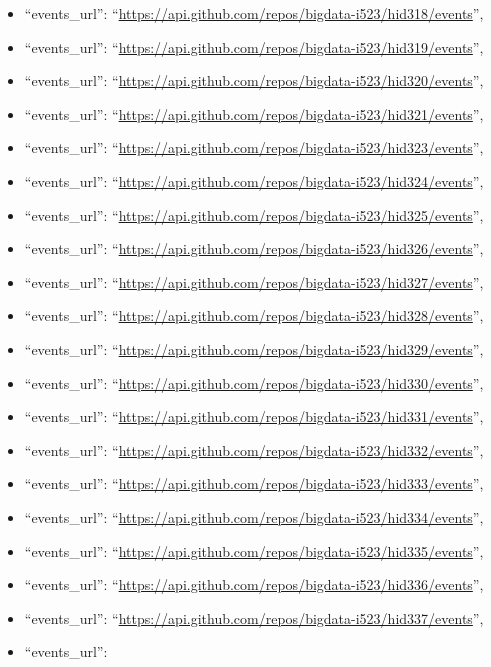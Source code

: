 \begin{itemize}
\item
  ``events\_url'':
  ``\url{https://api.github.com/repos/bigdata-i523/hid318/events}'',
\item
  ``events\_url'':
  ``\url{https://api.github.com/repos/bigdata-i523/hid319/events}'',
\item
  ``events\_url'':
  ``\url{https://api.github.com/repos/bigdata-i523/hid320/events}'',
\item
  ``events\_url'':
  ``\url{https://api.github.com/repos/bigdata-i523/hid321/events}'',
\item
  ``events\_url'':
  ``\url{https://api.github.com/repos/bigdata-i523/hid323/events}'',
\item
  ``events\_url'':
  ``\url{https://api.github.com/repos/bigdata-i523/hid324/events}'',
\item
  ``events\_url'':
  ``\url{https://api.github.com/repos/bigdata-i523/hid325/events}'',
\item
  ``events\_url'':
  ``\url{https://api.github.com/repos/bigdata-i523/hid326/events}'',
\item
  ``events\_url'':
  ``\url{https://api.github.com/repos/bigdata-i523/hid327/events}'',
\item
  ``events\_url'':
  ``\url{https://api.github.com/repos/bigdata-i523/hid328/events}'',
\item
  ``events\_url'':
  ``\url{https://api.github.com/repos/bigdata-i523/hid329/events}'',
\item
  ``events\_url'':
  ``\url{https://api.github.com/repos/bigdata-i523/hid330/events}'',
\item
  ``events\_url'':
  ``\url{https://api.github.com/repos/bigdata-i523/hid331/events}'',
\item
  ``events\_url'':
  ``\url{https://api.github.com/repos/bigdata-i523/hid332/events}'',
\item
  ``events\_url'':
  ``\url{https://api.github.com/repos/bigdata-i523/hid333/events}'',
\item
  ``events\_url'':
  ``\url{https://api.github.com/repos/bigdata-i523/hid334/events}'',
\item
  ``events\_url'':
  ``\url{https://api.github.com/repos/bigdata-i523/hid335/events}'',
\item
  ``events\_url'':
  ``\url{https://api.github.com/repos/bigdata-i523/hid336/events}'',
\item
  ``events\_url'':
  ``\url{https://api.github.com/repos/bigdata-i523/hid337/events}'',
\item
  ``events\_url'':

\end{itemize}
